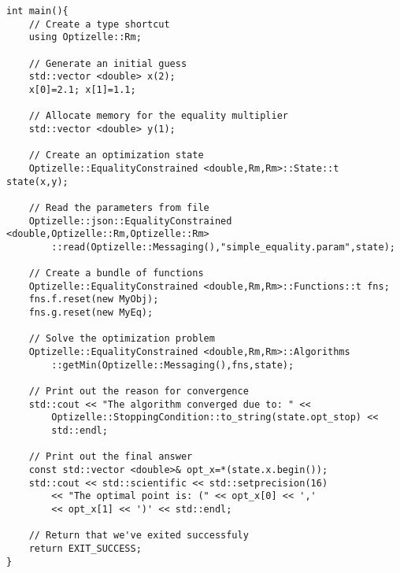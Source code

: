\begin{lstlisting}
int main(){
    // Create a type shortcut
    using Optizelle::Rm;

    // Generate an initial guess
    std::vector <double> x(2);
    x[0]=2.1; x[1]=1.1;

    // Allocate memory for the equality multiplier
    std::vector <double> y(1);
    
    // Create an optimization state
    Optizelle::EqualityConstrained <double,Rm,Rm>::State::t state(x,y);
    
    // Read the parameters from file 
    Optizelle::json::EqualityConstrained <double,Optizelle::Rm,Optizelle::Rm>
        ::read(Optizelle::Messaging(),"simple_equality.param",state);
    
    // Create a bundle of functions
    Optizelle::EqualityConstrained <double,Rm,Rm>::Functions::t fns;
    fns.f.reset(new MyObj);
    fns.g.reset(new MyEq);
    
    // Solve the optimization problem
    Optizelle::EqualityConstrained <double,Rm,Rm>::Algorithms
        ::getMin(Optizelle::Messaging(),fns,state);
    
    // Print out the reason for convergence
    std::cout << "The algorithm converged due to: " <<
        Optizelle::StoppingCondition::to_string(state.opt_stop) <<
        std::endl;
    
    // Print out the final answer
    const std::vector <double>& opt_x=*(state.x.begin());
    std::cout << std::scientific << std::setprecision(16)
        << "The optimal point is: (" << opt_x[0] << ','
        << opt_x[1] << ')' << std::endl;
    
    // Return that we've exited successfuly
    return EXIT_SUCCESS;
}
\end{lstlisting}
